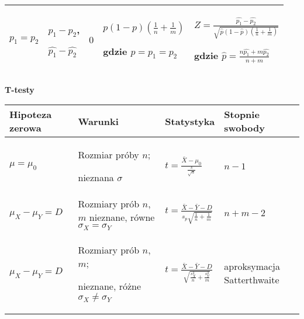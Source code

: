\documentclass[a4paper]{article}
\begin{document}
\begin{table}[H]
\begin{center}
\begin{tabular}{ p{2.5cm} |p{2.5cm} |p{1.5cm} |p{4cm} |p{4cm}}
                \cmidrule(r){1-5}

                $p_1 = p_2$ & $p_1 - p_2$,

                $\hat{p_1} - \hat{p_2}$ & $0$ & $p(1-p)(\frac{1}{n} + \frac{1}{m})$

                gdzie $p = p_1 = p_2$ & $Z = \frac{\hat{p_1} - \hat{p_2}}{\sqrt{\hat{p}(1-\hat{p})(\frac{1}{n} + \frac{1}{m})}}$

                gdzie $\hat{p} = \frac{n\hat{p_1} + m\hat{p_2}}{n + m}$\\
                \bottomrule
            \end{tabular}
        \end{center}
    \end{table}

    \textbf{T-testy}

    \begin{table}[H]
        \begin{center}
            \begin{tabular}{ p{} |p{} |p{} |p{}}
                \toprule
                Hipoteza zerowa & Warunki & Statystyka & Stopnie swobody\\
                \toprule

                $\mu = \mu_0$ & Rozmiar próby $n$;

                nieznana $\sigma$ & $t = \frac{\bar{X} - \mu_0}{\frac{s}{\sqrt{n}}}$ & $n-1$\\

                \cmidrule(r){1-4}

                $\mu_X - \mu_Y = D$ & Rozmiary prób $n$, $m$
                nieznane, równe $\sigma_X = \sigma_Y$ & $t = \frac{\bar{X} - \bar{Y} - D}{s_p\sqrt{\frac{1}{n}+\frac{1}{m}}}$
                & $n+m-2$\\

                \cmidrule(r){1-4}

                $\mu_X - \mu_Y = D$ & Rozmiary prób $n$, $m$;

                nieznane, różne $\sigma_X \neq \sigma_Y$ & $t = \frac{\bar{X} - \bar{Y} - D}{\sqrt{\frac{s_X^2}{n} + \frac{s_Y^2}{m}}}$
                & aproksymacja Satterthwaite\\

                \bottomrule
            \end{tabular}
        \end{center}
    \end{table}
\end{document}
